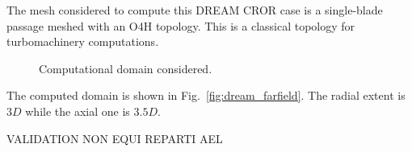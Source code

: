 
The mesh considered to compute this
DREAM CROR case is a single-blade passage meshed
with an O4H topology. This is a classical
topology for turbomachinery computations.
\begin{figure}[htb]
  \centering
  \caption{Computational domain considered.}
\end{figure}
The computed domain is shown in Fig.~\ref{fig:dream_farfield}.
The radial extent is $3D$ while the axial one is $3.5D$.


VALIDATION NON EQUI REPARTI AEL